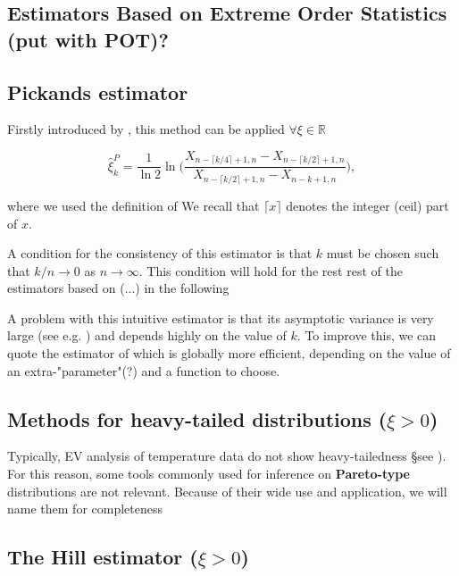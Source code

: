 \documentclass[11pt,a4paper,openany ]{book}
\begin{document}
\subsection{Estimators Based on Extreme Order Statistics (put with POT)?}

\subsection*{Pickands estimator}


Firstly introduced by \cite{pickands_statistical_1975}, this method can be applied $\forall\xi\in\mathbb{R}$

\begin{equation}
\hat{\xi}^P_{k}= \frac{1}{\ln 2}\ln \Bigg(\frac{X_{n-\lceil k/4\rceil +1,n}-X_{n-\lceil k/2\rceil+1,n}}{X_{n-\lceil k/2\rceil +1,n}-X_{n-k+1,n}}\Bigg),
\end{equation}

where we used the definition of \citet{beirlant_statistics_2006}
We recall that $\lceil x\rceil$ denotes the integer (ceil) part of $x$.

A condition for the consistency of this estimator is that $k$ must be chosen such that $k/n\rightarrow 0$ as $n\rightarrow \infty$. This condition will hold for the rest rest of the estimators based on (...) in the following 

A problem with this intuitive estimator is that its asymptotic variance is very large (see e.g. \cite{dekkers_estimation_1989}) and depends highly on the value of $k$. To improve this, we can quote the estimator of \cite{segers_generalized_2001} which is globally more efficient, depending on the value of an extra-"parameter"(?) and a function to choose.


\subsection*{Methods for heavy-tailed distributions ($\xi>0$)}

Typically, EV analysis of temperature data do not show heavy-tailedness §see \citet{}). For this reason, some tools commonly used for inference on \textbf{Pareto-type} distributions are not relevant. Because of their wide use and application, we will name them for completeness


\subsection*{The Hill estimator ($\xi>0$)}
\end{document}
